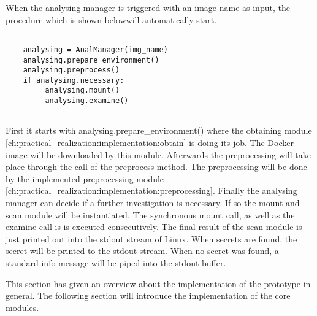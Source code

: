 When the analysing manager is triggered with an image name as input, the procedure which is shown belowwill automatically start.
\lstset{language=Python}          %
\begin{lstlisting}[]  % Start your code-block
	
    analysing = AnalManager(img_name)
    analysing.prepare_environment()
    analysing.preprocess()
    if analysing.necessary:
         analysing.mount()
         analysing.examine()
    
\end{lstlisting}
First it starts with analysing.prepare\_environment() where the obtaining module \ref{ch:practical_realization:implementation:obtain} is doing its job. The Docker image will be downloaded by this module. Afterwards the preprocessing will take place through the call of the preprocess method. The preprocessing will be done by the implemented preprocessing module \ref{ch:practical_realization:implementation:preprocessing}.
Finally the analysing manager can decide if a further investigation is necessary. If so the mount and scan module will be instantiated. The synchronous mount call, as well as the examine call is is executed consecutively. The final result of the scan module is just printed out into the stdout stream of Linux.
When secrets are found, the secret will be printed to the stdout stream. When no secret was found, a standard info message will be piped into the stdout buffer.

This section has given an overview about the implementation of the prototype in general. The following section will introduce the implementation of the core modules.

